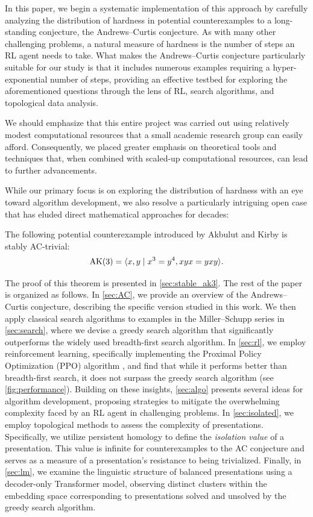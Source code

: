 In this paper, we begin a systematic implementation of this approach by carefully analyzing the distribution of hardness in potential counterexamples to a long-standing conjecture, the Andrews--Curtis conjecture. As with many other challenging problems, a natural measure of hardness is the number of steps an RL agent needs to take. What makes the Andrews--Curtis conjecture particularly suitable for our study is that it includes numerous examples requiring a hyper-exponential number of steps, providing an effective testbed for exploring the aforementioned questions through the lens of RL, search algorithms, and topological data analysis.

We should emphasize that this entire project was carried out using relatively modest computational resources that a small academic research group can easily afford. Consequently, we placed greater emphasis on theoretical tools and techniques that, when combined with scaled-up computational resources, can lead to further advancements.

While our primary focus is on exploring the distribution of hardness with an eye toward algorithm development, we also resolve a particularly intriguing open case that has eluded direct mathematical approaches for decades:

\begin{theorem}\label{thm:stableAK3}
	The following potential counterexample introduced by Akbulut and Kirby \cite{Akbulut--Kirby} is stably AC-trivial:
	\[
	\text{AK}(3) = \langle x, y \mid x^3 = y^{4}, xyx = yxy\rangle.
	\]
\end{theorem}

\medskip\noindent
The proof of this theorem is presented in \autoref{sec:stable_ak3}.
The rest of the paper is organized as follows. In \autoref{sec:AC}, we provide an overview of the Andrews--Curtis conjecture, describing the specific version studied in this work. We then apply classical search algorithms to examples in the Miller--Schupp series in \autoref{sec:search}, where we devise a greedy search algorithm that significantly outperforms the widely used breadth-first search algorithm. In \autoref{sec:rl}, we employ reinforcement learning, specifically implementing the Proximal Policy Optimization (PPO) algorithm \cite{schulman2017proximal}, and find that while it performs better than breadth-first search, it does not surpass the greedy search algorithm (see \autoref{fig:performance}). Building on these insights, \autoref{sec:algo} presents several ideas for algorithm development, proposing strategies to mitigate the overwhelming complexity faced by an RL agent in challenging problems. In \autoref{sec:isolated}, we employ topological methods to assess the complexity of presentations. Specifically, we utilize persistent homology to define the \textit{isolation value} of a presentation. This value is infinite for counterexamples to the AC conjecture and serves as a measure of a presentation's resistance to being trivialized. Finally, in \autoref{sec:lm}, we examine the linguistic structure of balanced presentations using a decoder-only Transformer model, observing distinct clusters within the embedding space corresponding to presentations solved and unsolved by the greedy search algorithm.

